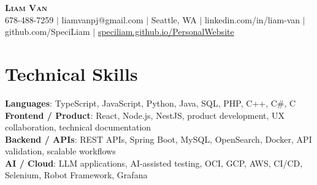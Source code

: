 \documentclass[letterpaper,11pt]{article}
\begin{document}

%
\begin{center}
    \textbf{\Huge \scshape Liam Van} \\ \vspace{1pt}
    \small 678-488-7259 $|$ \small {liamvanpj@gmail.com} $|$ Seattle, WA
 {{$|$ linkedin.com/in/liam-van} {$|$ github.com/SpeciLiam} {$|$ \href{https://speciliam.github.io/PersonalWebsite}{speciliam.github.io/PersonalWebsite}}}

\end{center}

\section{Technical Skills}
 \begin{itemize}[leftmargin=0.15in, label={}]
    \small{\item{
     \textbf{Languages}{: TypeScript, JavaScript, Python, Java, SQL, PHP, C++, C\#, C} \\
     \textbf{Frontend / Product}{: React, Node.js, NestJS, product development, UX collaboration, technical documentation} \\
     \textbf{Backend / APIs}{: REST APIs, Spring Boot, MySQL, OpenSearch, Docker, API validation, scalable workflows} \\
     \textbf{AI / Cloud}{: LLM applications, AI-assisted testing, OCI, GCP, AWS, CI/CD, Selenium, Robot Framework, Grafana} \\
    }}
 \end{itemize}
%
\end{document}
